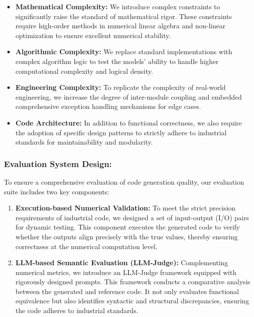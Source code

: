 \documentclass{article}
\theoremstyle{plain}
\theoremstyle{definition}
\theoremstyle{remark}
\begin{document}
\begin{itemize}

\item \textbf{Mathematical Complexity:} We introduce complex constraints to significantly raise the standard of mathematical rigor. These constraints require high-order methods in numerical linear algebra and non-linear optimization to ensure excellent numerical stability.
\vspace{-0.1cm}
\item \textbf{Algorithmic Complexity:} We replace standard implementations with complex algorithm logic to test the models' ability to handle higher computational complexity and logical density.
\vspace{-0.1cm}
\item \textbf{Engineering Complexity:} To replicate the complexity of real-world engineering, we increase the degree of inter-module coupling and embedded comprehensive exception handling mechanisms for edge cases.
\vspace{-0.1cm}
\item \textbf{Code Architecture:} In addition to functional correctness, we also require the adoption of specific design patterns to strictly adhere to industrial standards for maintainability and modularity.

\end{itemize}



\subsubsection{Evaluation System Design:}

To ensure a comprehensive evaluation of code generation quality, our evaluation suite includes two key components:

\begin{enumerate}[label=(\arabic*)]
\vspace{-0.2cm}
\item \textbf{Execution-based Numerical Validation:} To meet the strict precision requirements of industrial code, we designed a set of input-output (I/O) pairs for dynamic testing. This component executes the generated code to verify whether the outputs align precisely with the true values, thereby ensuring correctness at the numerical computation level.
\vspace{-0.2cm}
\item \textbf{LLM-based Semantic Evaluation (LLM-Judge):} Complementing numerical metrics, we introduce an LLM-Judge framework equipped with rigorously designed prompts. This framework conducts a comparative analysis between the generated and reference code. It not only evaluates functional equivalence but also identifies syntactic and structural discrepancies, ensuring the code adheres to industrial standards.
\end{enumerate}
\end{document}
